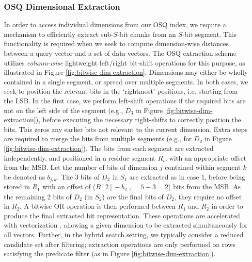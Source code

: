 \subsubsection{OSQ Dimensional Extraction}
In order to access individual dimensions from our OSQ index, we require a mechanism to efficiently extract sub-$S$-bit chunks from an $S$-bit segment. This functionality is required when we seek to compute dimension-wise distances between a query vector and a set of data vectors.
The OSQ extraction scheme utilizes \textit{column-wise} lightweight left/right bit-shift operations for this purpose, as illustrated in Figure \ref{fig:bitwise-dim-extraction}. 
Dimensions may either be wholly contained in a single segment, or spread over multiple segments.
In both cases, we seek to position the relevant bits in the `rightmost' positions, i.e. starting from the LSB.
In the first case, we perform left-shift operations if the required bits are not on the left side of the segment (e.g., $D_3$ in Figure \ref{fig:bitwise-dim-extraction}), before executing the necessary right-shifts to correctly position the bits. This zeros any earlier bits not relevant to the current dimension.
Extra steps are required to merge the bits from multiple segments (e.g., for $D_2$ in Figure \ref{fig:bitwise-dim-extraction}). The bits from each segment are extracted independently, and positioned in a residue segment $R_i$, with an appropriate offset from the MSB. Let the number of bits of dimension $j$ contained within segment $k$ be denoted as $b_{j,k}$. The 3 bits of $D_2$ in $S_1$ are extracted as in case 1, before being stored in $R_1$ with an offset of ($B[2] - b_{2,1} = 5 - 3 = 2$) bits from the MSB. As the remaining 2 bits of $D_2$ (in $S_2$) are the final bits of $D_2$, they require no offset in $R_2$. A bitwise OR operation is then performed between $R_1$ and $R_2$ in order to produce the final extracted bit representation.
These operations are accelerated with vectorization \cite{NumpyVectorization}, allowing a given dimension to be extracted simultaneously for all vectors. Further, in the hybrid search setting, we typically consider a reduced candidate set after filtering; extraction operations are only performed on rows satisfying the predicate filter (as in Figure \ref{fig:bitwise-dim-extraction}). 

